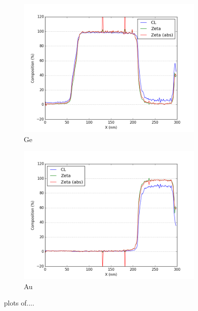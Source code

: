 \begin{figure}
\hfill
	\begin{subfigure}{.5\textwidth}
		\centering
		\includegraphics[width=\linewidth]{fig/q/2_Ge2}
		\caption{Ge}
		\label{fig:zeta_area2_ge}
	\end{subfigure}%
\hfill
	\begin{subfigure}{.5\textwidth}
		\centering
		\includegraphics[width=\linewidth]{fig/q/2_Au2}
		\caption{Au}
		\label{fig:zeta_area2_au}
	\end{subfigure}
	\caption{plots of....}
	\label{fig:zeta_area2}
\end{figure}


